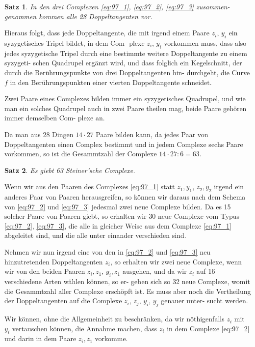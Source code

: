\documentclass[12pt,a4paper]{article}
\theoremstyle{plain}
\newtheorem{satz}{Satz}[section]
\theoremstyle{definition}
\theoremstyle{remark}
\begin{document}
\begin{satz}
In den drei Complexen \eqref{eq:97_1}, \eqref{eq:97_2}, \eqref{eq:97_3} zusammen-
genommen kommen alle 28 Doppeltangenten vor.
\end{satz}

Hieraus folgt, dass jede Doppeltangente, die mit irgend
einem Paare $z_i$, $y_i$ ein syzygetisches Tripel bildet, in dem Com-
plexe $z_i$, $y_i$ vorkommen muss, dass also jedes syzygetische Tripel
durch eine bestimmte weitere Doppeltangente zu einem syzygeti-
schen Quadrupel ergänzt wird, und dass folglich ein Kegelschnitt,
der durch die Berührungspunkte von drei Doppeltangenten hin-
durchgeht, die Curve $f$ in den Berührungspunkten einer vierten
Doppeltangente schneidet.

Zwei Paare eines Complexes bilden immer ein syzygetisches
Quadrupel, und wie man ein solches Quadrupel auch in zwei
Paare theilen mag, beide Paare gehören immer demselben Com-
plexe an.

Da man aus 28 Dingen $14 \cdot 27$ Paare bilden kann, da jedes
Paar von Doppeltangenten einen Complex bestimmt und in jedem
Complexe sechs Paare vorkommen, so ist die Gesammtzahl der
Complexe $14 \cdot 27 : 6 = 63$.

\begin{satz}
Es giebt 63 Steiner'sche Complexe.
\end{satz}

Wenn wir aus den Paaren des Complexes \eqref{eq:97_1} statt $z_1, y_1$, $z_2, y_2$
irgend ein anderes Paar von Paaren herausgreifen, so können
wir daraus nach dem Schema von \eqref{eq:97_2} und \eqref{eq:97_3} jedesmal zwei
neue Complexe bilden. Da es 15 solcher Paare von Paaren giebt,
so erhalten wir 30 neue Complexe vom Typus \eqref{eq:97_2}, \eqref{eq:97_3}, die alle
in gleicher Weise aus dem Complexe \eqref{eq:97_1} abgeleitet sind, und die
alle unter einander verschieden sind.

Nehmen wir nun irgend eine von den in \eqref{eq:97_2} und \eqref{eq:97_3} neu
hinzutretenden Doppeltangenten $z_i$, so erhalten wir zwei neue
Complexe, wenn wir von den beiden Paaren $z_i, z_1$, $y_i, z_1$ ausgehen,
und da wir $z_i$ auf 16 verschiedene Arten wählen können, so er-
geben sich so 32 neue Complexe, womit die Gesammtzahl aller
Complexe erschöpft ist. Es muss aber noch die Vertheilung der
Doppeltangenten auf die Complexe $z_i$, $z_j$, $y_i$, $y_j$ genauer unter-
sucht werden.

Wir können, ohne die Allgemeinheit zu beschränken, da
wir nöthigenfalls $z_i$ mit $y_i$ vertauschen können, die Annahme
machen, dass $z_i$ in dem Complexe \eqref{eq:97_2} und darin in dem Paare
$z_i, z_1$ vorkomme.
\end{document}
